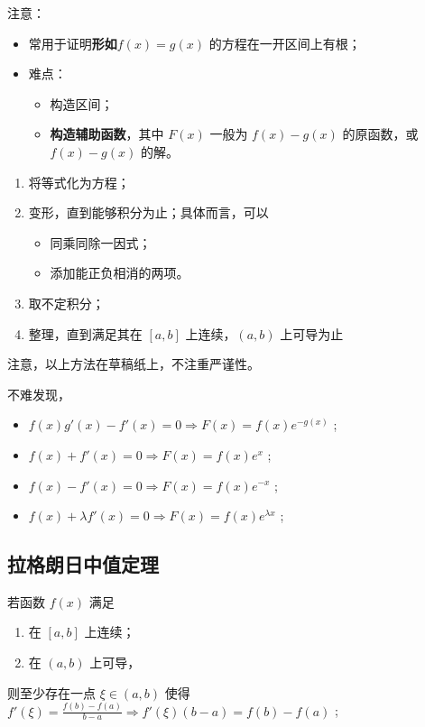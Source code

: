 注意：
\begin{itemize}
    \item 常用于证明\textbf{形如}$ f(x)=g(x) $ 的方程在一开区间上有根；
    \item 难点：\begin{itemize}
        \item 构造区间；
        \item \textbf{构造辅助函数}，其中 $ F(x) $ 一般为 $ f(x)-g(x) $ 的原函数，或 $ f(x)-g(x) $ 的解。
    \end{itemize}
\end{itemize}

\begin{Field}[构造辅助函数的方法]

    \begin{enumerate}
        \item 将等式化为方程；
        \item 变形，直到能够积分为止；具体而言，可以\begin{itemize}
            \item 同乘同除一因式；
            \item 添加能正负相消的两项。
        \end{itemize}
        \item 取不定积分；
        \item 整理，直到满足其在 $ [a,b] $ 上连续，$ (a,b) $ 上可导为止
    \end{enumerate}
    注意，以上方法在草稿纸上，不注重严谨性。
\end{Field}

不难发现，\begin{itemize}
    \item $ f(x)g'(x)-f'(x)=0\Rightarrow F(x)=f(x)e^{-g(x)} $ ;
    \item $ f(x)+f'(x)=0\Rightarrow F(x)=f(x)e^x $ ;
    \item $ f(x)-f'(x)=0\Rightarrow F(x)=f(x)e^{-x} $ ;
    \item $ f(x)+\lambda f'(x)=0\Rightarrow F(x)=f(x)e^{\lambda x} $ ;
\end{itemize}

\subsection{拉格朗日中值定理}

\begin{Theo}[拉格朗日中值定理]

    若函数 $ f(x) $ 满足
    \begin{enumerate}
        \item 在 $ [a,b] $ 上连续；
        \item 在 $ (a,b) $ 上可导， 
    \end{enumerate}
    则至少存在一点 $ \xi \in (a,b) $ 使得 $ f'(\xi)=\frac{f(b)-f(a)}{b-a} 
    \Rightarrow f'(\xi)(b-a)=f(b)-f(a)$ ;
\end{Theo}

